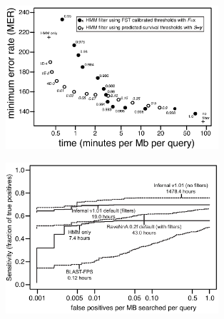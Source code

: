 \documentclass{bioinfo}
\begin{document}
\begin{figure}[tpb]
\centerline{\includegraphics[width=3.1in]{figs/mervtime}}

\label{Fig:mervtime}
\end{figure}

\begin{figure}[tpb]
\centerline{\includegraphics[width=3.1in]{figs/roc}}

\label{Fig:roc}
\end{figure}
\end{document}

